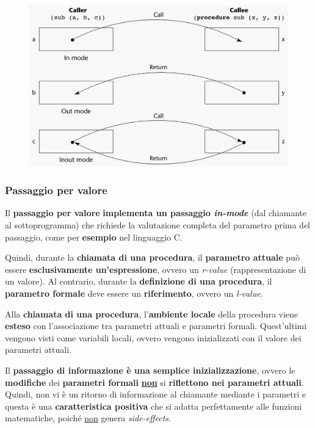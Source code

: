 \documentclass[a4paper]{article}
\begin{document}
	\begin{figure}[!htp]
		\centering
		\includegraphics[width=\textwidth]{img/passaggio_dei_parametri.png}
	\end{figure}\newpage
	
	\subsubsection{Passaggio per valore}\label{passaggio per valore}
	
	Il \textcolor{Red3}{\textbf{passaggio per valore}} \textbf{implementa un passaggio \emph{in-mode}} (dal chiamante al sottoprogramma) che richiede la valutazione completa del parametro prima del passaggio, come per \textcolor{Green4}{\textbf{esempio}} nel linguaggio C.\newline
	
	\noindent
	Quindi, durante la \textbf{chiamata di una procedura}, il \textbf{parametro attuale} può essere \textbf{esclusivamente un'espressione}, ovvero un \emph{r-value} (rappresentazione di un valore). Al contrario, durante la \textbf{definizione di una procedura}, il \textbf{parametro formale} deve essere un \textbf{riferimento}, ovvero un \emph{l-value}.\newline
	
	\noindent
	Alla \textbf{chiamata di una procedura}, l'\textbf{ambiente locale} della procedura viene \textbf{esteso} con l'associazione tra parametri attuali e parametri formali. Quest'ultimi vengono visti come variabili locali, ovvero vengono inizializzati con il valore dei parametri attuali.
	
	Il \textbf{passaggio di informazione è una semplice inizializzazione}, ovvero le \textbf{modifiche} dei \textbf{parametri formali} \underline{\textbf{non}} si \textbf{riflettono nei parametri attuali}. Quindi, non vi è un ritorno di informazione al chiamante mediante i parametri e questa è una \textcolor{Green4}{\textbf{caratteristica positiva}} che si adatta perfettamente alle funzioni matematiche, poiché \underline{non} genera \emph{side-effects}.\newline
	
\end{document}
